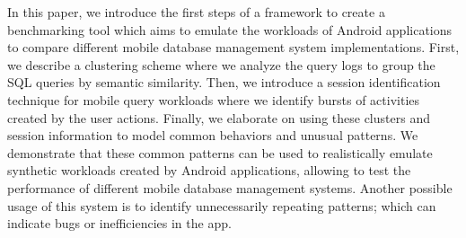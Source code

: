 In this paper, we introduce the first steps of a framework to create a benchmarking tool which aims to emulate the workloads of Android applications to compare different mobile database management system implementations.
First, we describe a clustering scheme where we analyze the query logs to group the SQL queries by semantic similarity.
Then, we introduce a session identification technique for mobile query workloads where we identify bursts of activities created by the user actions.
Finally, we elaborate on using these clusters and session information to model common behaviors and unusual patterns.
We demonstrate that these common patterns can be used to realistically emulate synthetic workloads created by Android applications, allowing to test the performance of different mobile database management systems.
Another possible usage of this system is to identify unnecessarily repeating patterns; which can indicate bugs or inefficiencies in the app.
